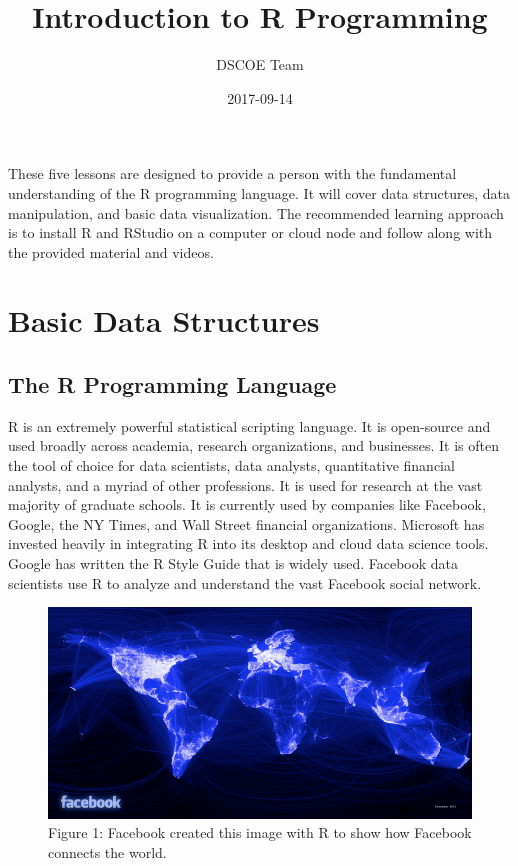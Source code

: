 \documentclass[]{book}
\title{Introduction to R Programming}
\author{DSCOE Team}
\date{2017-09-14}
\begin{document}
\maketitle

{
\setcounter{tocdepth}{1}
\tableofcontents
}
These five lessons are designed to provide a person with the fundamental
understanding of the R programming language. It will cover data
structures, data manipulation, and basic data visualization. The
recommended learning approach is to install R and RStudio on a computer
or cloud node and follow along with the provided material and videos.

\chapter{Basic Data Structures}\label{basic-data-structures}

\section{The R Programming Language}\label{the-r-programming-language}

R is an extremely powerful statistical scripting language. It is
open-source and used broadly across academia, research organizations,
and businesses. It is often the tool of choice for data scientists, data
analysts, quantitative financial analysts, and a myriad of other
professions. It is used for research at the vast majority of graduate
schools. It is currently used by companies like Facebook, Google, the NY
Times, and Wall Street financial organizations. Microsoft has invested
heavily in integrating R into its desktop and cloud data science tools.
Google has written the R Style Guide that is widely used. Facebook data
scientists use R to analyze and understand the vast Facebook social
network.

\begin{figure}[htbp]
\centering
\includegraphics{facebook.png}
\caption{Figure 1: Facebook created this image with R to show how
Facebook connects the world.}
\end{figure}
\end{document}
